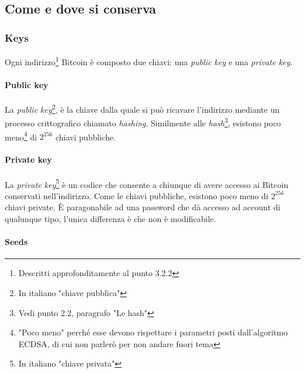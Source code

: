 \documentclass {article}
\begin{document}
\subsection {Come e dove si conserva}


\subsubsection {Keys}


Ogni indirizzo\footnote{Descritti approfonditamente al punto 3.2.2} Bitcoin è composto due chiavi: una \textit{public key} e una \textit{private key}.


\paragraph {Public key}

La \textit{public key}\footnote{In italiano "chiave pubblica"}, è la chiave dalla quale si può ricavare l'indirizzo mediante un processo crittografico chiamato \textit{hashing}.
Similmente alle \textit{hash}\footnote{Vedi punto 2.2, paragrafo "Le hash"}, esistono poco meno\footnote{"Poco meno" perché esse devono rispettare i parametri posti dall'algoritmo ECDSA, di cui non parlerò per non andare fuori tema} di $2^{256}$ chiavi pubbliche.


\paragraph {Private key}

La \textit{private key}\footnote{In italiano "chiave privata"} è un codice che consente a chiunque di avere accesso ai Bitcoin conservati nell'indirizzo.
Come le chiavi pubbliche, esistono poco meno di $2^{256}$ chiavi private.
È paragonabile ad una password che dà accesso ad account di qualunque tipo, l'unica differenza è che non è modificabile.

\paragraph {Seeds}
\end{document}
